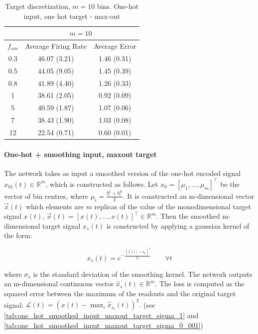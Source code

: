 \documentclass[10pt,a4paper, final]{report} %
\begin{document}
\begin{table}[H]
\centering
\begin{tabular}{c|c|c|}
\cline{2-3}
                          & \multicolumn{2}{|c|}{$m= 10$}            	\\ \hline
\multicolumn{1}{|c|}{$f_{sin}$} & Average Firing Rate & Average Error    \\ \hline
\multicolumn{1}{|c|}{0.3} & 46.07 (3.21)  & 1.46 (0.31) \\
\multicolumn{1}{|c|}{0.5} & 44.05 (9.05)  & 1.45 (0.39) \\
\multicolumn{1}{|c|}{0.8} & 41.89 (4.40)  & 1.26 (0.33) \\
\multicolumn{1}{|c|}{1}   & 38.61 (2.05)  & 0.92 (0.09) \\
\multicolumn{1}{|c|}{5}   & 40.59 (1.87)  & 1.07 (0.06) \\
\multicolumn{1}{|c|}{7}   & 38.43 (1.90)  & 1.03 (0.08) \\
\multicolumn{1}{|c|}{12}  & 22.54 (0.71) & 0.60 (0.01) \\ \hline
\end{tabular}
\caption{Target discretization, $m=10$ bins. One-hot input, one hot target - max-out}
\label{tab:one_hot_input_maxout_target}
\end{table}

\paragraph{One-hot + smoothing input, maxout target}
The network takes as input a smoothed version of the one-hot encoded signal $x_{01}(t) \in \mathbb{R}^m$, which is constructed as follows.
Let $x_0 = [\mu_1, \ldots, \mu_m ]^\intercal$ be the vector of bin centres, where $\mu_i = \frac{b_i^L + b_i^R}{2}.$
It is constructed an m-dimensional vector $\vec{x}(t)$ which elements are $m$ replicas of the value of the monodimensional target signal $x(t)$, $\vec{x}(t) = [x(t), \ldots, x(t)]^\intercal \in \mathbb{R}^m$.
Then the smoothed m-dimensional target signal $x_s(t)$ is constructed by applying a gaussian kernel of the form:

\begin{equation}
x_s(t) = e^{-\frac{(\vec{x}(t) - x_0)^2}{\sigma_s}}\qquad\forall t
\end{equation}

where $\sigma_s$ is the standard deviation of the smoothing kernel. The network outputs an m-dimensional continuous vector $\hat{x}_s(t) \in \mathbb{R}^m$.
The loss is computed as the squared error between the maximum of the readouts and the original target signal: $\mathcal{L}(t) =  (x(t) - \max_i \hat{x}_{s_i}(t))^2$. (see \autoref{tab:one_hot_smoothed_input_maxout_target_sigma_1} and \autoref{tab:one_hot_smoothed_input_maxout_target_sigma_0_001})
\end{document}
